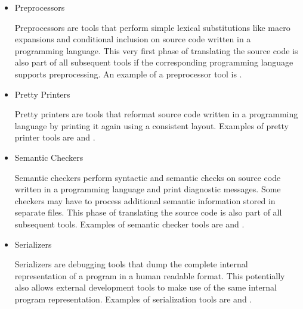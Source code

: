 \begin{itemize}

\item Preprocessors\nopagebreak

Preprocessors are tools that perform simple lexical substitutions like macro expansions and conditional inclusion on source code written in a programming language.
This very first phase of translating the source code is also part of all subsequent tools if the corresponding programming language supports preprocessing.
An example of a preprocessor tool is .


\item Pretty Printers\nopagebreak

Pretty printers are tools that reformat source code written in a programming language by printing it again using a consistent layout.
Examples of pretty printer tools are  and .


\item Semantic Checkers\nopagebreak

Semantic checkers perform syntactic and semantic checks on source code written in a programming language and print diagnostic messages.
Some checkers may have to process additional semantic information stored in separate files.
This phase of translating the source code is also part of all subsequent tools.
Examples of semantic checker tools are  and .


\item Serializers\nopagebreak

Serializers are debugging tools that dump the complete internal representation of a program in a human readable format.
This potentially also allows external development tools to make use of the same internal program representation.
Examples of serialization tools are  and .


\end{itemize}
